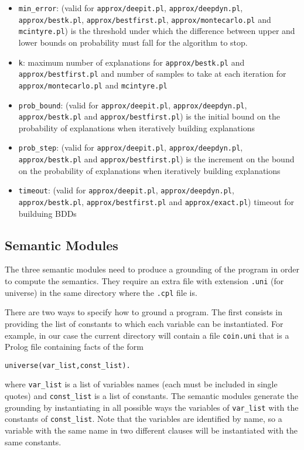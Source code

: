 \documentclass[a4paper,10pt]{scrartcl}
\begin{document}
\begin{itemize}
\item \verb|min_error|: (valid for \texttt{approx/deepit.pl}, \texttt{approx/deepdyn.pl}, \texttt{approx/bestk.pl}, \texttt{approx/bestfirst.pl}, \texttt{approx/montecarlo.pl} and \texttt{mcintyre.pl}) is the threshold under which the difference between upper and lower bounds on probability must fall for the algorithm to stop.
\item \verb|k|: maximum number of explanations  for \texttt{approx/bestk.pl} and \texttt{approx/bestfirst.pl} and number of samples to take at each iteration for \texttt{approx/montecarlo.pl} and \texttt{mcintyre.pl}
\item \verb|prob_bound|: (valid for \texttt{approx/deepit.pl}, \texttt{approx/deepdyn.pl}, \texttt{approx/bestk.pl} and \texttt{approx/bestfirst.pl}) is the initial bound on the probability of explanations when iteratively building explanations
\item \verb|prob_step|: (valid for \texttt{approx/deepit.pl}, \texttt{approx/deepdyn.pl}, \texttt{approx/bestk.pl} and \texttt{approx/bestfirst.pl}) is the increment on the bound on the probability of explanations when iteratively building explanations
\item \verb|timeout|: (valid for \texttt{approx/deepit.pl}, \texttt{approx/deepdyn.pl}, \texttt{approx/bestk.pl}, \texttt{approx/bestfirst.pl} and \texttt{approx/exact.pl}) timeout for builduing BDDs
\end{itemize}

\subsection{Semantic Modules}
The three semantic modules need to produce a grounding of the program in order to compute the semantics.
They require an extra file with extension \texttt{.uni} (for universe) in the same directory where the \texttt{.cpl} file is.

There are two ways to specify how to ground a program. The first consists in providing  the list of constants to which each variable can be instantiated. For example, in our case the current directory will contain a file \texttt{coin.uni} that is a Prolog file containing facts of the form
\begin{verbatim}
universe(var_list,const_list).
\end{verbatim}
where \verb|var_list| is a list of variables names (each must be included in single quotes) and \verb|const_list| is a list of constants. The semantic modules generate the grounding by instantiating in all possible ways the variables of \verb|var_list| with the constants of \verb|const_list|. Note that the variables are identified by name, so a variable with the same name in two different clauses will be instantiated with the same constants.
\end{document}
